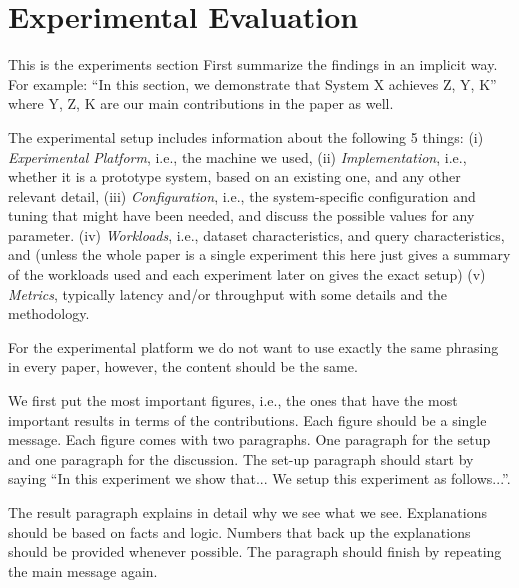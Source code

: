 \section{Experimental Evaluation} \label{sec:experiments}
This is the experiments section
First summarize the findings in an implicit way. For example: 
``In this section, we demonstrate that System X achieves Z, Y, K'' 
where Y, Z, K are our main contributions in the paper as well. 

The experimental setup includes information about the following 5 things:
(i) \textit{Experimental Platform}, i.e., the machine we used, 
(ii) \textit{Implementation}, i.e., whether it is a prototype system, based on an existing one, and any other relevant detail,
(iii) \textit{Configuration}, i.e., the system-specific configuration and tuning that might have been needed, and discuss the possible values for any parameter.
(iv) \textit{Workloads}, i.e., dataset characteristics, and query characteristics, and (unless the whole paper is a single experiment this here just gives a summary of the workloads used and each experiment later on gives the exact setup)
(v) \textit{Metrics}, typically latency and/or throughput with some details and the 
methodology.

For the experimental platform we do 
not want to use exactly the same phrasing in every paper, however, the content should 
be the same.

We first put the most important figures, i.e., the 
ones that have the most important results in terms 
of the contributions. Each figure should be a 
single message. Each figure comes with two 
paragraphs. One paragraph for the setup and one 
paragraph for the discussion. The set-up paragraph 
should start by saying ``In this experiment we 
show that... We setup this experiment as follows...''.

The result paragraph explains in detail why we see 
what we see. Explanations should be based on facts 
and logic. Numbers that back up the explanations 
should be provided whenever possible. The 
paragraph should finish by repeating the main 
message again. 


